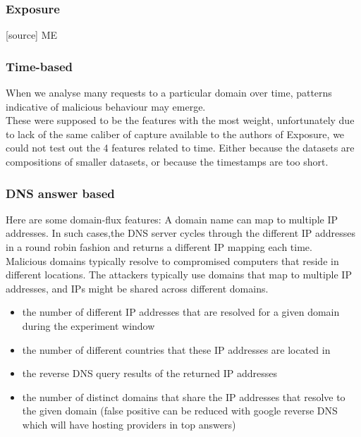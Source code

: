 \subsubsection{Exposure}
[source]
ME
\\

\subsubsection{Time-based}
When we analyse many requests to a particular domain over
time, patterns indicative of malicious behaviour may emerge.\\
These were supposed to be the features with the most weight, unfortunately due to lack of the same caliber of capture available to the authors of Exposure, we could not test out the 4 features related to time. Either because the datasets are compositions of smaller datasets, or because the timestamps are too short.
\subsubsection{DNS answer based}
Here are some domain-flux features: A domain name can map to multiple IP addresses. In such cases,the DNS server cycles through the different IP addresses in a round robin fashion and returns a different IP mapping each time. \\
Malicious domains typically resolve to compromised computers that reside in different locations. The attackers typically use domains that map to multiple IP addresses, and IPs might be shared across different domains.
\begin{itemize}
\item the number of different IP addresses that are resolved for a given domain during the experiment window
\item the number of different countries that these IP addresses are located in
\item the reverse DNS query results of the returned IP addresses
\item the number of distinct domains that share the IP addresses that resolve to the given domain (false positive can be reduced with google reverse DNS which will have hosting providers in top answers)
\end{itemize}
